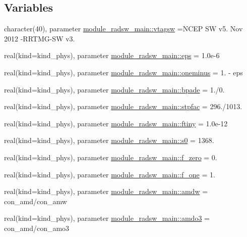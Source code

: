 \subsection*{Variables}
\begin{DoxyCompactItemize}
\item 
character(40), parameter \hyperlink{namespacemodule__radsw__main_a93334abce2ca8bfdcdfe5edd4ae1f093}{module\+\_\+radsw\+\_\+main\+::vtagsw} =\textquotesingle{}N\+C\+EP SW v5. Nov 2012 -\/R\+R\+T\+MG-\/SW v3. \textquotesingle{}
\item 
real(kind=kind\+\_\+phys), parameter \hyperlink{namespacemodule__radsw__main_a7d311ceb7f824ea31d31ba8144751b5a}{module\+\_\+radsw\+\_\+main\+::eps} = 1.\+0e-\/6
\item 
real(kind=kind\+\_\+phys), parameter \hyperlink{namespacemodule__radsw__main_ac666738c31ea648cae506a47e5a4e43d}{module\+\_\+radsw\+\_\+main\+::oneminus} = 1. -\/ eps
\item 
real(kind=kind\+\_\+phys), parameter \hyperlink{namespacemodule__radsw__main_acd9ae7c14cbfdc55f1f0fff637ca0331}{module\+\_\+radsw\+\_\+main\+::bpade} = 1./0.
\item 
real(kind=kind\+\_\+phys), parameter \hyperlink{namespacemodule__radsw__main_a4d32ea8f0f1bca37e3351a5ae5077f77}{module\+\_\+radsw\+\_\+main\+::stpfac} = 296./1013.
\item 
real(kind=kind\+\_\+phys), parameter \hyperlink{namespacemodule__radsw__main_abe91ed52b6016e99a2d0c874524fb27f}{module\+\_\+radsw\+\_\+main\+::ftiny} = 1.\+0e-\/12
\item 
real(kind=kind\+\_\+phys), parameter \hyperlink{namespacemodule__radsw__main_a244c149eb05c0675a7e040dbf7e2bc4b}{module\+\_\+radsw\+\_\+main\+::s0} = 1368.
\item 
real(kind=kind\+\_\+phys), parameter \hyperlink{namespacemodule__radsw__main_ad54ac2d2bd5c4b3bd692c76d2a0bcc5d}{module\+\_\+radsw\+\_\+main\+::f\+\_\+zero} = 0.
\item 
real(kind=kind\+\_\+phys), parameter \hyperlink{namespacemodule__radsw__main_ad256aaca9c9d6b5d161ae21f68989db6}{module\+\_\+radsw\+\_\+main\+::f\+\_\+one} = 1.
\item 
real(kind=kind\+\_\+phys), parameter \hyperlink{namespacemodule__radsw__main_a1445a63250d89083447371120c484618}{module\+\_\+radsw\+\_\+main\+::amdw} = con\+\_\+amd/con\+\_\+amw
\item 
real(kind=kind\+\_\+phys), parameter \hyperlink{namespacemodule__radsw__main_a527e5e1cec6ad0800f69a606fde77369}{module\+\_\+radsw\+\_\+main\+::amdo3} = con\+\_\+amd/con\+\_\+amo3

\end{DoxyCompactItemize}
